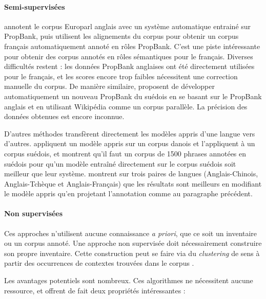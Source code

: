 \paragraph{Semi-supervisées}

\cite{vanderplas2014cross} annotent le corpus Europarl anglais avec un système
automatique entrainé sur PropBank, puis utilisent les alignements du corpus
pour obtenir un corpus français automatiquement annoté en rôles PropBank. C'est
une piste intéressante pour obtenir des corpus annotés en rôles sémantiques
pour le français. Diverses difficultés restent : les données PropBank anglaises
ont été directement utilisées pour le français, et les scores encore trop
faibles nécessitent une correction manuelle du corpus. De manière similaire,
\cite{exner2014using} proposent de développer automatiquement un nouveau
PropBank du suédois en se basant sur le PropBank anglais et en utilisant
Wikipédia comme un corpus parallèle. La précision des données obtenues est
encore inconnue.


D'autres méthodes transfèrent directement les modèles appris d'une langue vers
d'autres. \citep{zeman2008cross} appliquent un modèle appris sur un corpus
danois et l'appliquent à un corpus suédois, et montrent qu'il faut un corpus de
1500 phrases annotées en suédois pour qu'un modèle entraîné directement sur le
corpus suédois soit meilleur que leur système. \citep{kozhevnikov2013cross}
montrent sur trois paires de langues (Anglais-Chinois, Anglais-Tchèque et
Anglais-Français) que les résultats sont meilleurs en modifiant le modèle
appris qu'en projetant l'annotation comme au paragraphe précédent.

\paragraph{Non supervisées}

Ces approches n'utilisent aucune connaissance \textit{a priori}, que ce soit un
inventaire ou un corpus annoté. Une approche non supervisée doit nécessairement
construire son propre inventaire. Cette construction peut se faire via du
\textit{clustering} de sens à partir des occurrences de contextes trouvées dans
le corpus
\citep{lang2011unsupervised,garg2012unsupervised,titov2012bayesian,materna2013parameter}.

Les avantages potentiels sont nombreux. Ces algorithmes ne nécessitent aucune
ressource, et offrent de fait deux propriétés intéressantes :

